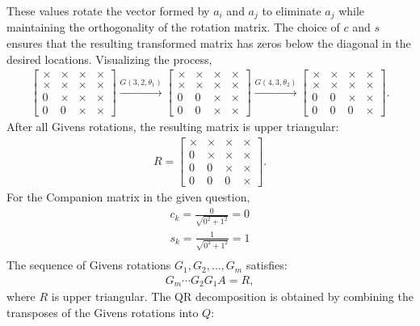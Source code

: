 \documentclass[journal]{IEEEtran}
\begin{document}
These values rotate the vector formed by $a_{i}$ and $a_{j}$ to eliminate $a_{j}$ while maintaining the orthogonality of the rotation matrix. The choice of $c$ and $s$ ensures that the resulting transformed matrix has zeros below the diagonal in the desired locations.
Visualizing the process,
\begin{align}
\begin{bmatrix}
\times & \times & \times & \times \\
\times & \times & \times & \times \\
0 & \times & \times & \times \\
0 & 0 & \times & \times
\end{bmatrix}
\xrightarrow{G(3,2,\theta_1)}
\begin{bmatrix}
\times & \times & \times & \times \\
\times & \times & \times & \times \\
0 & 0 & \times & \times \\
0 & 0 & \times & \times
\end{bmatrix}
\xrightarrow{G(4,3,\theta_2)}
\begin{bmatrix}
\times & \times & \times & \times \\
\times & \times & \times & \times \\
0 & 0 & \times & \times \\
0 & 0 & 0 & \times
\end{bmatrix}.
\end{align}
After all Givens rotations, the resulting matrix is upper triangular:
\begin{align}
R = \begin{bmatrix}
\times & \times & \times & \times \\
0 & \times & \times & \times \\
0 & 0 & \times & \times \\
0 & 0 & 0 & \times
\end{bmatrix}.
\end{align}
For the Companion matrix in the given question,
\begin{align}
  c_k = \frac{0}{\sqrt{0^2 + 1^2}} = 0\\
  s_k = \frac{1}{\sqrt{0^2 + 1^2}} = 1\\
\end{align}
The sequence of Givens rotations $G_1, G_2, \dots, G_m$ satisfies:
\begin{align}
G_m \cdots G_2 G_1 A = R,
\end{align}
where \(R\) is upper triangular. The QR decomposition is obtained by combining the transposes of the Givens rotations into \(Q\):
\end{document}
